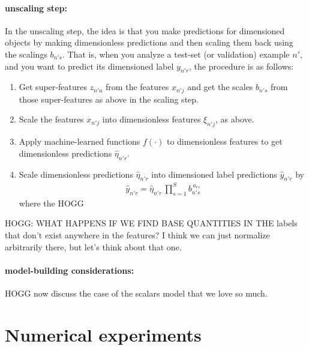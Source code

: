 \documentclass{article}
\begin{document}
\paragraph{unscaling step:}
In the unscaling step, the idea is that you make predictions for dimensioned objects by making dimensionless predictions and then scaling them back using the scalings $b_{n's}$.
That is, when you analyze a test-set (or validation) example $n'$, and you want to predict its dimensioned label $y_{n'r}$, the procedure is as follows:
\begin{enumerate}
    \item Get super-features $z_{n'u}$ from the features $x_{n'j}$ and get the scales $b_{n's}$ from those super-features as above in the scaling step.
    \item Scale the features $x_{n'j}$ into dimensionless features $\xi_{n'j}$, as above.
    \item Apply machine-learned functions $f(\cdot)$ to dimensionless features to get dimensionless predictions $\hat{\eta}_{n'r}$.
    \item Scale dimensionless predictions $\hat{\eta}_{n'r}$ into dimensioned label predictions $\hat{y}_{n'r}$ by
    \begin{align}
        \hat{y}_{n'r} = \hat{\eta}_{n'r}\,\prod_{s=1}^S b_{n's}^{\,a_{rs}}
    \end{align}
    where the HOGG
\end{enumerate}

HOGG: WHAT HAPPENS IF WE FIND BASE QUANTITIES IN THE labels that don't exist anywhere in the features? I think we can just normalize arbitrarily there, but let's think about that one.

\paragraph{model-building considerations:}
HOGG now discuss the case of the scalars model that we love so much.

\section{Numerical experiments}
\end{document}

